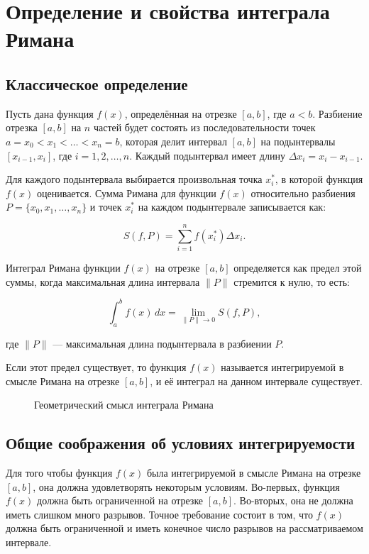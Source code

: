 
\section{Определение и свойства интеграла Римана}

\subsection{Классическое определение}

Пусть дана функция \( f(x) \), определённая на отрезке \( [a, b] \), где \(a <
b\). Разбиение отрезка \( [a, b] \) на \( n \) частей будет состоять из
последовательности точек \( a = x_0 < x_1 < \dots < x_n = b \), которая делит
интервал \( [a, b] \) на подынтервалы \( [x_{i-1}, x_i] \), где \( i = 1, 2,
\dots, n \). Каждый подынтервал имеет длину \( \Delta x_i = x_i - x_{i-1} \).

Для каждого подынтервала выбирается произвольная точка \( x_i^* \), в которой
функция \( f(x) \) оценивается. Сумма Римана для функции \( f(x) \) относительно
разбиения \( P = \{ x_0, x_1, \dots, x_n \} \) и точек \( x_i^* \) на каждом
подынтервале записывается как:

\[ S(f, P) = \sum_{i=1}^{n} f(x_i^*) \Delta x_i.  \]

Интеграл Римана функции \( f(x) \) на отрезке \( [a, b] \) определяется как
предел этой суммы, когда максимальная длина интервала \( \|P\| \) стремится к
нулю, то есть:

\[ \int_a^b f(x) \, dx = \lim_{\|P\| \to 0} S(f, P), \]

где \( \|P\| \) — максимальная длина подынтервала в разбиении \( P \).

Если этот предел существует, то функция \( f(x) \) называется интегрируемой в
смысле Римана на отрезке \( [a, b] \), и её интеграл на данном интервале
существует.

\begin{figure}[h]
\caption{Геометрический смысл интеграла Римана }
\end{figure}

\subsection{Общие соображения об условиях интегрируемости}

Для того чтобы функция \( f(x) \) была интегрируемой в смысле Римана на отрезке
\( [a, b] \), она должна удовлетворять некоторым условиям. Во-первых, функция \(
f(x) \) должна быть ограниченной на отрезке \( [a, b] \). Во-вторых, она не
должна иметь слишком много разрывов. Точное требование состоит в том, что \(
f(x) \) должна быть ограниченной и иметь конечное число разрывов на
рассматриваемом интервале.

